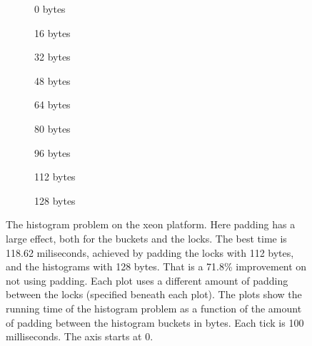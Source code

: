 \begin{figure}[hbpt]
	\graphicspath{{plots/}}
	\begin{subfigure}{0.32\textwidth}
		
		\caption{0 bytes}
	\end{subfigure}
	\begin{subfigure}{0.32\textwidth}
		
		\caption{16 bytes}
	\end{subfigure}
	\begin{subfigure}{0.32\textwidth}
		
		\caption{32 bytes}
	\end{subfigure}
	\begin{subfigure}{0.32\textwidth}
		
		\caption{48 bytes}
	\end{subfigure}
	\begin{subfigure}{0.32\textwidth}
		
		\caption{64 bytes}
	\end{subfigure}
	\begin{subfigure}{0.32\textwidth}
		
		\caption{80 bytes}
	\end{subfigure}
	\begin{subfigure}{0.32\textwidth}
		
		\caption{96 bytes}
	\end{subfigure}
	\begin{subfigure}{0.32\textwidth}
		
		\caption{112 bytes}
	\end{subfigure}
	\begin{subfigure}{0.32\textwidth}
		
		\caption{128 bytes}
	\end{subfigure}
	\caption{The histogram problem on the xeon platform. Here padding has a
	large effect, both for the buckets and the locks. The best time is
	118.62 miliseconds, achieved by padding the locks with 112 bytes, and
	the histograms with 128 bytes. That is a 71.8\% improvement on not using
	padding.
	Each plot uses a
	different amount of padding between the locks (specified beneath each
	plot). The plots show the running time of the histogram problem as a
	function of the amount of padding between the histogram buckets in
	bytes. Each tick is 100 milliseconds. The axis starts at 0.}
	\label{fig:histo-local-xeon}
\end{figure}
